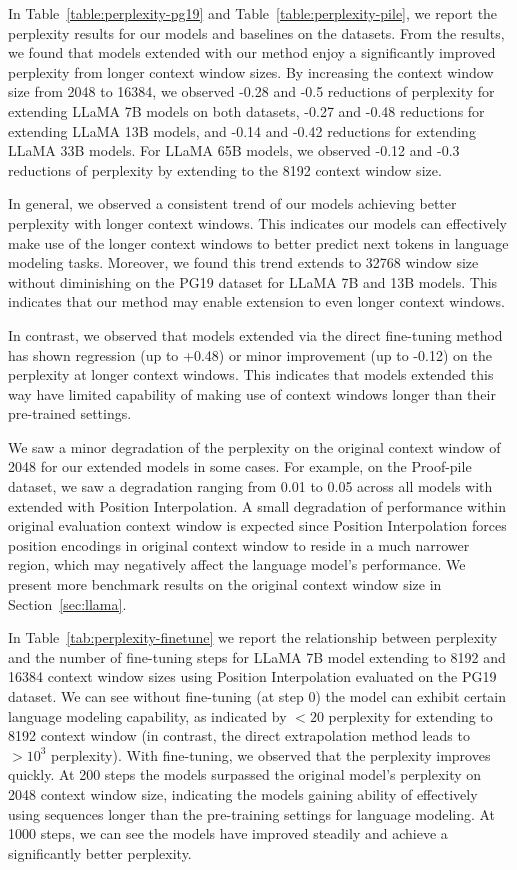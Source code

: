 \documentclass{article} %
\theoremstyle{definition}
\begin{document}
In Table~\ref{table:perplexity-pg19} and Table~\ref{table:perplexity-pile}, we report the perplexity results for our models and baselines on the datasets. From the results, we found that models extended with our method enjoy a significantly 
improved perplexity from longer context window sizes. 
By increasing the context window size from 2048 to 16384, we observed -0.28 and -0.5 reductions of perplexity for extending LLaMA 7B models on both datasets,
-0.27 and -0.48 reductions for extending LLaMA 13B models, and -0.14 and -0.42 reductions for extending LLaMA 33B models. 
For LLaMA 65B models, we observed -0.12 and -0.3 reductions of perplexity by extending to the 8192 context window size.

In general, we observed a consistent trend of our models achieving better perplexity with
longer context windows.  
This indicates our models can effectively make use of the longer context windows to
better predict next tokens in language modeling tasks.
Moreover, we found this trend extends to 32768 window size without diminishing on the PG19 dataset for LLaMA 7B and 13B models. 
This indicates that our method may enable extension to even longer context windows.

In contrast, we observed that models extended via the direct fine-tuning method has shown 
regression (up to +0.48) or minor improvement (up to -0.12) on the perplexity at longer context windows.
This indicates that models extended this way have limited capability of making
use of context windows longer than their pre-trained settings.

We saw a minor degradation of the perplexity on the original context window of 2048 for our extended models in some cases.
For example, on the Proof-pile dataset, we saw a degradation ranging from 0.01 to 0.05 across all models with extended with Position Interpolation. 
A small degradation of performance within original evaluation context window is expected since Position Interpolation forces position encodings in original context window to reside in a much  narrower region, which may negatively affect the language model's performance.
We present more benchmark results on the original context window size in Section~\ref{sec:llama}.

In Table~\ref{tab:perplexity-finetune} we report the relationship between perplexity and the number of fine-tuning steps
for LLaMA 7B model extending to 8192 and 16384 context window sizes using Position Interpolation evaluated
on the PG19 dataset.
We can see without fine-tuning (at step 0) the model can exhibit certain language modeling capability, as 
indicated by $<20$ perplexity for extending to 8192 context window (in contrast, the direct extrapolation method leads to $>10^3$ perplexity).
With fine-tuning, we observed that the perplexity improves quickly. 
At 200 steps the models surpassed the original model's perplexity on 2048 context window size, indicating the models
gaining ability of effectively using sequences longer  than the pre-training settings for language modeling.
At 1000 steps, we can see the models have improved steadily and achieve a significantly better perplexity.
\end{document}
